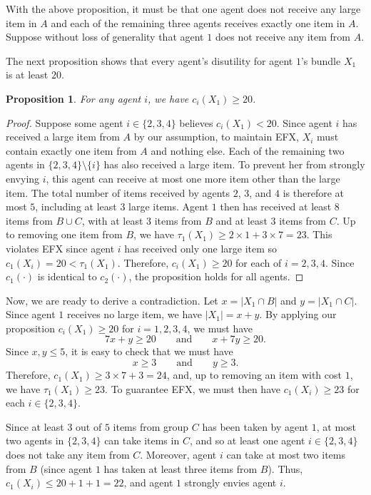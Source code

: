 \documentclass{article}
\newtheorem{proposition}{Proposition}
\theoremstyle{definition}
\begin{document}
With the above proposition, it must be that one agent does not receive any large item in $A$ and each of the remaining three agents receives exactly one item in $A$.
Suppose without loss of generality that agent $1$ does not receive any item from $A$.

The next proposition shows that every agent's disutility for agent $1$'s bundle $X_1$ is at least $20$.
\begin{proposition}
    For any agent $i$, we have $c_i(X_1)\geq 20$.
\end{proposition}
\begin{proof}
    Suppose some agent $i\in \{2,3,4\}$ believes $c_i(X_1)<20$.
    Since agent $i$ has received a large item from $A$ by our assumption,  to maintain EFX, $X_i$ must contain exactly one item from $A$ and nothing else.
    Each of the remaining two agents in $\{2,3,4\}\setminus\{i\}$ has also received a large item. 
    To prevent her from strongly envying $i$, this agent can receive at most one more item other than the large item.
    The total number of items received by agents $2$, $3$, and $4$ is therefore at most $5$, including at least $3$ large items.
    Agent $1$ then has received at least $8$ items from $B\cup C$, with at least $3$ items from $B$ and at least $3$ items from $C$.
    Up to removing one item from $B$, we have $\tau_1(X_1)\geq 2\times 1+3\times 7=23$.
    This violates EFX since agent $i$ has received only one large item so $c_1(X_i)=20<\tau_1(X_1)$.
    Therefore, $c_i(X_1)\geq 20$ for each of $i=2,3,4$.
    Since $c_1(\cdot)$ is identical to $c_2(\cdot)$, the proposition holds for all agents.
\end{proof}

Now, we are ready to derive a contradiction.
Let $x=|X_1\cap B|$ and $y=|X_1\cap C|$.
Since agent $1$ receives no large item, we have $|X_1|=x+y$.
By applying our proposition $c_i(X_1)\geq 20$ for $i=1,2,3,4$, we must have
$$7x+y\geq 20\qquad\mbox{and}\qquad x+7y\geq20.$$
Since $x,y\leq 5$, it is easy to check that we must have
$$x\geq 3\qquad\mbox{and}\qquad y\geq3.$$
Therefore, $c_1(X_1)\geq 3\times 7+3=24$, and, up to removing an item with cost $1$, we have $\tau_1(X_1)\geq 23$.
To guarantee EFX, we must then have $c_1(X_i)\geq23$ for each $i\in\{2,3,4\}$.

Since at least $3$ out of $5$ items from group $C$ has been taken by agent $1$, at most two agents in $\{2,3,4\}$ can take items in $C$, and so at least one agent $i\in \{2,3,4\}$ does not take any item from $C$.
Moreover, agent $i$ can take at most two items from $B$ (since agent $1$ has taken at least three items from $B$).
Thus, $c_1(X_i)\leq 20+1+1=22$, and agent $1$ strongly envies agent $i$.
\end{document}
